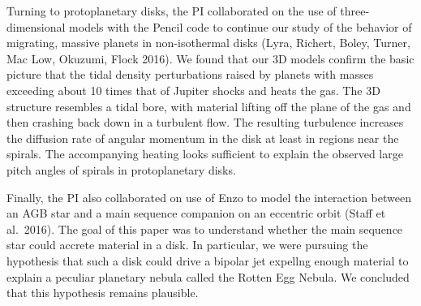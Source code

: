 \documentclass[11pt,preprint]{article}
\begin{document}
Turning to protoplanetary disks, the PI collaborated on the use of three-dimensional models with the Pencil code to continue our study of the behavior of migrating, massive planets in non-isothermal disks (Lyra, Richert, Boley, Turner, Mac Low, Okuzumi, Flock 2016).  We found that our 3D models confirm the basic picture that  the tidal density perturbations raised by planets with masses exceeding about 10 times that of Jupiter shocks and  heats the gas. The 3D structure resembles a tidal bore, with material lifting off the plane of the gas and then crashing back down in a turbulent flow.  The resulting turbulence increases the diffusion rate of angular momentum in the disk at least in regions near the spirals. The accompanying heating looks sufficient to explain the observed large pitch angles of spirals in protoplanetary disks.

Finally, the PI also collaborated on use of Enzo to model the interaction between an AGB star and a main sequence companion on an eccentric orbit (Staff et al.\ 2016).  The goal of this paper was to understand whether the main sequence star could accrete material in a disk. In particular, we were pursuing the hypothesis that such a disk could drive a bipolar jet expellng enough material to explain a peculiar planetary nebula called the Rotten Egg Nebula.  We concluded that this hypothesis remains plausible.
\end{document}
